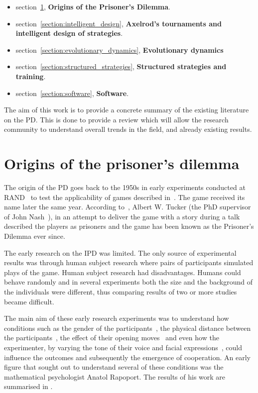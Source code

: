 \begin{itemize}
    \item section~\ref{section:origin}, \textbf{Origins of the Prisoner's
    Dilemma}.
    \item section~\ref{section:intelligent_design}, \textbf{Axelrod's
    tournaments and intelligent design of strategies}.
    \item section~\ref{section:evolutionary_dynamics}, \textbf{Evolutionary dynamics}
    \item section~\ref{section:structured_strategies}, \textbf{Structured
    strategies and training}.
    \item section~\ref{section:software}, \textbf{Software}.
\end{itemize}

The aim of this work is to provide a concrete summary of the existing literature
on the PD. This is done to provide a review which will allow the research
community to understand overall trends in the field, and already existing
results.

\section{Origins of the prisoner's dilemma}\label{section:origin}

The origin of the PD goes back to the 1950s in early experiments conducted at
RAND~\cite{Flood1958} to test the applicability of games described
in~\cite{VonNeumann1944}. The game received its name later the same year.
According to~\cite{Tucker1983}, Albert W. Tucker (the PhD supervisor of John
Nash~\cite{Nash1951}), in an attempt to deliver the game with a story during a
talk described the players as prisoners and the game has been known as the
Prisoner's Dilemma ever since.

The early research on the IPD was limited. The only source of
experimental results was through human subject research where pairs of
participants simulated plays of the game. Human subject research had
disadvantages. Humans could behave randomly and in several experiments both the
size and the background of the individuals were different, thus comparing
results of two or more studies became difficult.

The main aim of these early research experiments was to understand how
conditions such as the gender of the participants~\cite{Evans1966, Lutzker1961,
Mack1971}, the physical distance between the participants~\cite{Sensenig1972}, the
effect of their opening moves~\cite{Tedeschi1968} and even how the experimenter, by varying
the tone of their voice and facial expressions~\cite{Gallo1968}, could influence
the outcomes and subsequently the emergence of cooperation. An early figure that
sought out to understand several of these conditions was the mathematical
psychologist Anatol Rapoport. The results of his work are summarised
in \cite{rapoport1965}.

